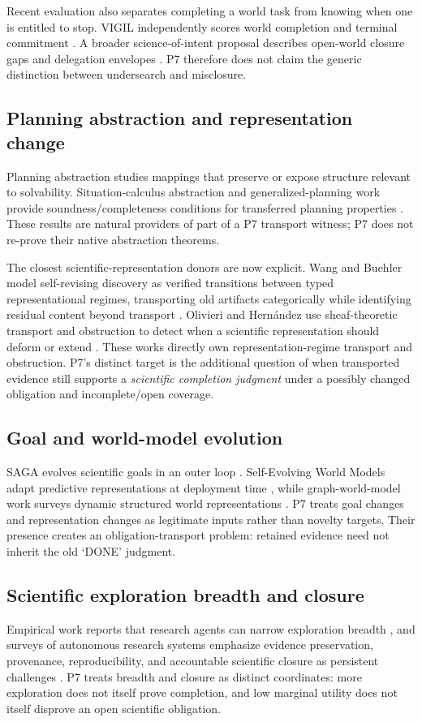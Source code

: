\documentclass[11pt]{article}
\begin{document}
Recent evaluation also separates completing a world task from knowing when one is entitled to stop. VIGIL independently scores world completion and terminal commitment \cite{vigil2026}. A broader science-of-intent proposal describes open-world closure gaps and delegation envelopes \cite{intent2026}. P7 therefore does not claim the generic distinction between undersearch and misclosure.

\subsection{Planning abstraction and representation change}
Planning abstraction studies mappings that preserve or expose structure relevant to solvability. Situation-calculus abstraction and generalized-planning work provide soundness\slash completeness conditions for transferred planning properties \cite{banihashemi2017,dong2025}. These results are natural providers of part of a P7 transport witness; P7 does not re-prove their native abstraction theorems.

The closest scientific-representation donors are now explicit. Wang and Buehler model self-revising discovery as verified transitions between typed representational regimes, transporting old artifacts categorically while identifying residual content beyond transport \cite{categorical2026}. Olivieri and Hern\'andez use sheaf-theoretic transport and obstruction to detect when a scientific representation should deform or extend \cite{sheaf2026}. These works directly own representation-regime transport and obstruction. P7's distinct target is the additional question of when transported evidence still supports a \emph{scientific completion judgment} under a possibly changed obligation and incomplete/open coverage.

\subsection{Goal and world-model evolution}
SAGA evolves scientific goals in an outer loop \cite{saga2025}. Self-Evolving World Models adapt predictive representations at deployment time \cite{sewm2026}, while graph-world-model work surveys dynamic structured world representations \cite{gwm2026}. P7 treats goal changes and representation changes as legitimate inputs rather than novelty targets. Their presence creates an obligation-transport problem: retained evidence need not inherit the old `DONE' judgment.

\subsection{Scientific exploration breadth and closure}
Empirical work reports that research agents can narrow exploration breadth \cite{narrow2026}, and surveys of autonomous research systems emphasize evidence preservation, provenance, reproducibility, and accountable scientific closure as persistent challenges \cite{autoresearch2026}. P7 treats breadth and closure as distinct coordinates: more exploration does not itself prove completion, and low marginal utility does not itself disprove an open scientific obligation.
\end{document}
